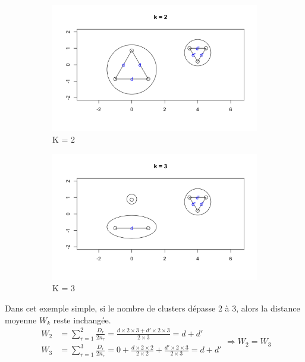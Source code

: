 \begin{figure}[H]
    \centering
    \begin{subfigure}[b]{0.45\linewidth}
        \centering
        \includegraphics[width=\linewidth]{images/2k.png}
        \caption{K = 2}
        \label{fig:2k}
    \end{subfigure}
    \hspace{0.05\linewidth} %
    \begin{subfigure}[b]{0.45\linewidth}
        \centering
        \includegraphics[width=\linewidth]{images/3k.png}
        \caption{K = 3}
        \label{fig:3k}
    \end{subfigure}
    
    \caption{}
    \label{fig:side-by-side}
\end{figure}

Dans cet exemple simple, si le nombre de clusters dépasse 2 à 3, alors la distance moyenne $W_k$ reste inchangée.
$$
\begin{aligned}
W_2 &= \sum_{r=1}^{2} \frac{D_r}{2 n_r} =\frac{ d \times 2 \times 3 + d' \times 2 \times 3}{2\times3} = d+d'\\
 W_3 &=\sum_{r=1}^{3} \frac{D_r}{2 n_r} =0+ \frac{d \times 2 \times 2}{2 \times 2 }+\frac{d' \times 2 \times 3 }{2 \times 3 } = d+d'
\end{aligned}
\Longrightarrow W_2 = W_3
$$

